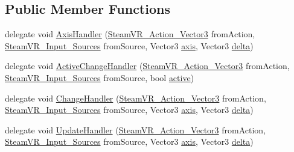 \subsection*{Public Member Functions}
\begin{DoxyCompactItemize}
\item 
delegate void \mbox{\hyperlink{class_valve_1_1_v_r_1_1_steam_v_r___action___vector3_a9b135b663b22c421dc36dbc48d2d35b6}{Axis\+Handler}} (\mbox{\hyperlink{class_valve_1_1_v_r_1_1_steam_v_r___action___vector3}{Steam\+V\+R\+\_\+\+Action\+\_\+\+Vector3}} from\+Action, \mbox{\hyperlink{namespace_valve_1_1_v_r_a82e5bf501cc3aa155444ee3f0662853f}{Steam\+V\+R\+\_\+\+Input\+\_\+\+Sources}} from\+Source, Vector3 \mbox{\hyperlink{class_valve_1_1_v_r_1_1_steam_v_r___action___vector3_a915afdc4075b4df59abf6f9797eadd36}{axis}}, Vector3 \mbox{\hyperlink{class_valve_1_1_v_r_1_1_steam_v_r___action___vector3_ac9b63c985650849f1c2ac32212ddef3e}{delta}})
\item 
delegate void \mbox{\hyperlink{class_valve_1_1_v_r_1_1_steam_v_r___action___vector3_a47d6c1c558fb45841cd626df9ab3dcb9}{Active\+Change\+Handler}} (\mbox{\hyperlink{class_valve_1_1_v_r_1_1_steam_v_r___action___vector3}{Steam\+V\+R\+\_\+\+Action\+\_\+\+Vector3}} from\+Action, \mbox{\hyperlink{namespace_valve_1_1_v_r_a82e5bf501cc3aa155444ee3f0662853f}{Steam\+V\+R\+\_\+\+Input\+\_\+\+Sources}} from\+Source, bool \mbox{\hyperlink{interface_valve_1_1_v_r_1_1_i_steam_v_r___action___source_a529749f5fa62c29a4faac767cd9ece8d}{active}})
\item 
delegate void \mbox{\hyperlink{class_valve_1_1_v_r_1_1_steam_v_r___action___vector3_a78943f89733a1c1a8e12cb4896e65907}{Change\+Handler}} (\mbox{\hyperlink{class_valve_1_1_v_r_1_1_steam_v_r___action___vector3}{Steam\+V\+R\+\_\+\+Action\+\_\+\+Vector3}} from\+Action, \mbox{\hyperlink{namespace_valve_1_1_v_r_a82e5bf501cc3aa155444ee3f0662853f}{Steam\+V\+R\+\_\+\+Input\+\_\+\+Sources}} from\+Source, Vector3 \mbox{\hyperlink{class_valve_1_1_v_r_1_1_steam_v_r___action___vector3_a915afdc4075b4df59abf6f9797eadd36}{axis}}, Vector3 \mbox{\hyperlink{class_valve_1_1_v_r_1_1_steam_v_r___action___vector3_ac9b63c985650849f1c2ac32212ddef3e}{delta}})
\item 
delegate void \mbox{\hyperlink{class_valve_1_1_v_r_1_1_steam_v_r___action___vector3_a99c0524f104c6d8c94a0e874b0ecc813}{Update\+Handler}} (\mbox{\hyperlink{class_valve_1_1_v_r_1_1_steam_v_r___action___vector3}{Steam\+V\+R\+\_\+\+Action\+\_\+\+Vector3}} from\+Action, \mbox{\hyperlink{namespace_valve_1_1_v_r_a82e5bf501cc3aa155444ee3f0662853f}{Steam\+V\+R\+\_\+\+Input\+\_\+\+Sources}} from\+Source, Vector3 \mbox{\hyperlink{class_valve_1_1_v_r_1_1_steam_v_r___action___vector3_a915afdc4075b4df59abf6f9797eadd36}{axis}}, Vector3 \mbox{\hyperlink{class_valve_1_1_v_r_1_1_steam_v_r___action___vector3_ac9b63c985650849f1c2ac32212ddef3e}{delta}})

\end{DoxyCompactItemize}
